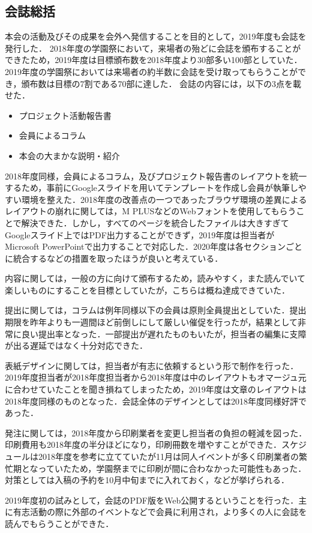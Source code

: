 \subsection*{会誌総括}


本会の活動及びその成果を会外へ発信することを目的として，2019年度も会誌を発行した．
2018年度の学園祭において，来場者の殆どに会誌を頒布することができたため，2019年度は目標頒布数を2018年度より30部多い100部としていた．
2019年度の学園祭においては来場者の約半数に会誌を受け取ってもらうことができ，頒布数は目標の7割である70部に達した．
会誌の内容には，以下の3点を載せた．
\begin{itemize}
  \item プロジェクト活動報告書
  \item 会員によるコラム
  \item 本会の大まかな説明・紹介
\end{itemize}

2018年度同様，会員によるコラム，及びプロジェクト報告書のレイアウトを統一するため，事前にGoogleスライドを用いてテンプレートを作成し会員が執筆しやすい環境を整えた．2018年度の改善点の一つであったブラウザ環境の差異によるレイアウトの崩れに関しては，M PLUSなどのWebフォントを使用してもらうことで解決できた．しかし，すべてのページを統合したファイルは大きすぎてGoogleスライド上ではPDF出力することができず，2019年度は担当者がMicrosoft PowerPointで出力することで対応した．2020年度は各セクションごとに統合するなどの措置を取ったほうが良いと考えている．

内容に関しては，一般の方に向けて頒布するため，読みやすく，また読んでいて楽しいものにすることを目標としていたが，こちらは概ね達成できていた．

提出に関しては，コラムは例年同様\thirdGrade{}以下の会員は原則全員提出としていた．提出期限を昨年よりも一週間ほど前倒しにして厳しい催促を行ったが，結果として非常に良い提出率となった．一部提出が遅れたものもいたが，担当者の編集に支障が出る遅延ではなく十分対応できた．

表紙デザインに関しては，担当者が有志に依頼するという形で制作を行った．2019年度担当者が2018年度担当者から2018年度は中のレイアウトもオマージュ元に合わせていたことを聞き損ねてしまったため，2019年度は文章のレイアウトは2018年度同様のものとなった．会誌全体のデザインとしては2018年度同様好評であった．

発注に関しては，2018年度から印刷業者を変更し担当者の負担の軽減を図った．印刷費用も2018年度の半分ほどになり，印刷冊数を増やすことができた．スケジュールは2018年度を参考に立てていたが11月は同人イベントが多く印刷業者の繁忙期となっていたため，学園祭までに印刷が間に合わなかった可能性もあった．対策としては入稿の予約を10月中旬までに入れておく，などが挙げられる．

2019年度初の試みとして，会誌のPDF版をWeb公開するということを行った．主に有志活動の際に外部のイベントなどで会員に利用され，より多くの人に会誌を読んでもらうことができた．

